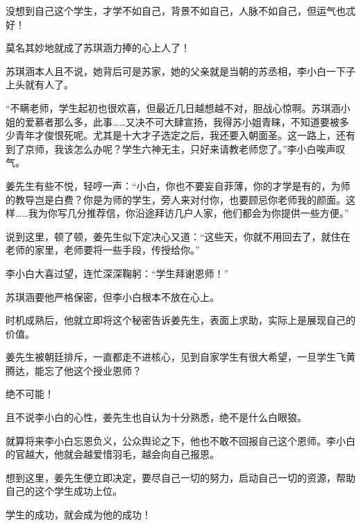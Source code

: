 \begin{this_body}
没想到自己这个学生，才学不如自己，背景不如自己，人脉不如自己，但运气也忒好！

莫名其妙地就成了苏琪涵力捧的心上人了！

苏琪涵本人且不说，她背后可是苏家，她的父亲就是当朝的苏丞相，李小白一下子上头就有人了。

“不瞒老师，学生起初也很欢喜，但最近几日越想越不对，胆战心惊啊。苏琪涵小姐的爱慕者那么多，此事……又决不可大肆宣扬，我得苏小姐青睐，不知道要被多少青年才俊恨死呢。尤其是十大才子选定之后，我还要入朝面圣。这一路上，还有到了京师，我该怎么办呢？学生六神无主，只好来请教老师您了。”李小白唉声叹气。

姜先生有些不悦，轻哼一声：“小白，你也不要妄自菲薄，你的才学是有的，为师的教导岂是白费？你是为师的学生，旁人来对付你，也要顾忌你老师我的颜面。这样……我为你写几分推荐信，你沿途拜访几户人家，他们都会为你提供一些方便。”

说到这里，顿了顿，姜先生似下定决心又道：“这些天，你就不用回去了，就住在老师的家里，老师要将一些手段，传授给你。”

李小白大喜过望，连忙深深鞠躬：“学生拜谢恩师！”

苏琪涵要他严格保密，但李小白根本不放在心上。

时机成熟后，他就立即将这个秘密告诉姜先生，表面上求助，实际上是展现自己的价值。

姜先生被朝廷排斥，一直都走不进核心，见到自家学生有很大希望，一旦学生飞黄腾达，能忘了他这个授业恩师？

绝不可能！

且不说李小白的心性，姜先生也自认为十分熟悉，绝不是什么白眼狼。

就算将来李小白忘恩负义，公众舆论之下，他也不敢不回报自己这个恩师。李小白的官越大，他就会越爱惜羽毛，越会向自己报恩。

想到这里，姜先生便立即决定，要尽自己一切的努力，启动自己一切的资源，帮助自己的这个学生成功上位。

学生的成功，就会成为他的成功！

\end{this_body}

